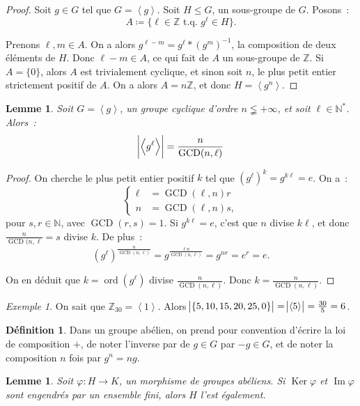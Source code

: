 \documentclass{article}
\newtheorem{lem}[thm]{Lemme}
\theoremstyle{definition}
\newtheorem{déf}[thm]{Définition}
\theoremstyle{remark}
\newtheorem{ex}{Exemple}[section]
\DeclareMathOperator{\ord}{ord}
\DeclareMathOperator{\Imf}{Im}
\DeclareMathOperator{\Ker}{Ker}
\DeclareMathOperator{\GCD}{GCD}
\newcommand{\Z}{\mathbb Z}
\newcommand{\N}{\mathbb N}
\newcommand{\tq}{\text{ t.q. }}
\newcommand{\eng}[1]{\left\langle#1\right\rangle}
\begin{document}
	\begin{proof} Soit $g \in G$ tel que $G = \eng g$. Soit $H \leq G$, un sous-groupe de $G$. Posons~:
	\[A \coloneqq \{\ell \in \Z \tq g^\ell \in H\}.\]

	Prenons $\ell, m \in A$. On a alors $g^{\ell-m} = g^\ell*(g^m)^{-1}$, la composition de deux éléments de $H$. Donc $\ell-m \in A$, ce qui fait de $A$ un
	sous-groupe de $\Z$. Si $A = \{0\}$, alors $A$ est trivialement cyclique, et sinon soit $n$, le plus petit entier strictement positif de $A$. On a alors
	$A = n\Z$, et donc $H = \eng {g^n}$.
	\end{proof}

	\begin{lem} Soit $G = \eng g$, un groupe cyclique d'ordre $n \lneqq +\infty$, et soit $\ell \in \N^*$. Alors~:
	\[\abs {\eng {g^\ell}} = \frac n{\GCD(n, \ell)}\]
	\end{lem}

	\begin{proof} On cherche le plus petit entier positif $k$ tel que $(g^\ell)^k = g^{k\ell} = e$. On a~:
	\[\begin{cases}
		\ell &= \GCD(\ell, n)r \\
		n &= \GCD(\ell, n)s,
	\end{cases}\]
	pour $s, r \in \N$, avec $\GCD(r, s) = 1$. Si $g^{k\ell} = e$, c'est que $n$ divise $k\ell$, et donc $\frac n{\GCD(n, \ell} = s$ divise $k$. De plus~:
	\[\left(g^{\ell}\right)^{\frac n{\GCD(n, \ell)}} = g^{\frac {\ell n}{\GCD(n, \ell)}} = g^{nr} = e^r = e.\]

	On en déduit que $k = \ord(g^\ell)$ divise $\frac n{\GCD(n, \ell)}$. Donc $k = \frac n{\GCD(n, \ell)}$.
	\end{proof}

	\begin{ex} On sait que $\Z_{30} = \eng {1}$. Alors $\abs {\{5, 10, 15, 20, 25, 0\}} = \abs {\eng 5} = \frac {30}5 = 6$.
	\end{ex}

	\begin{déf} Dans un groupe abélien, on prend pour convention d'écrire la loi de composition $+$, de noter l'inverse par de $g \in G$ par $-g \in G$, et
	de noter la composition $n$ fois par $g^n = ng$.
	\end{déf}

	\begin{lem} Soit $\varphi : H \to K$, un morphisme de groupes abéliens. Si $\Ker \varphi$ et $\Imf \varphi$ sont engendrés par un ensemble fini, alors $H$
	l'est également.
	\end{lem}
\end{document}
